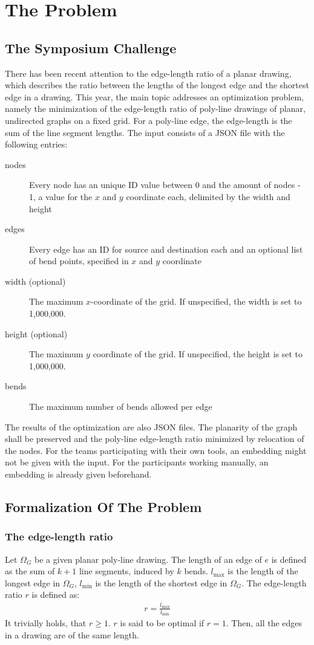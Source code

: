 \section{The Problem}

\subsection{The Symposium Challenge}
There has been recent attention to the edge-length ratio of a planar drawing, which describes the ratio between the lengths of the longest edge and the shortest edge in a drawing. 
\newline This year, the main topic addresses an optimization problem, namely the minimization of the edge-length ratio of poly-line drawings of planar, undirected graphs on a fixed grid. For a poly-line edge, the edge-length is the sum of the line segment lengths.
\bigbreak The input consists of a JSON file with the following entries:
\begin{description}
	\item[nodes] Every node has an unique ID value between 0 and the amount of nodes - 1, a value for the $x$ and $y$ coordinate each, delimited by the width and height
	\item[edges] Every edge has an ID for source and destination each and an optional list of bend points, specified in $x$ and $y$ coordinate
	\item[width (optional)] The maximum $x$-coordinate of the grid. If unspecified, the width is set to 1,000,000.
	\item[height (optional)] The maximum $y$ coordinate of the grid. If unspecified, the height is set to 1,000,000.
	\item[bends] The maximum number of bends allowed per edge
\end{description}
The results of the optimization are also JSON files. The planarity of the graph shall be preserved and the poly-line edge-length ratio minimized by relocation of the nodes.
\bigbreak For the teams participating with their own tools, an embedding might not be given with the input. For the participants working manually, an embedding is already given beforehand.
\cite{GDContest}
\subsection{Formalization Of The Problem}
\subsubsection{The edge-length ratio}
Let $\Omega_G$ be a given planar poly-line drawing. The length of an edge of $e$ is defined as the sum of $k+1$ line segments, induced by $k$ bends. $l_{\max}$ is the length of the longest edge in $\Omega_G$, $l_{\min}$ is the length of the shortest edge in $\Omega_G$. The edge-length ratio $r$ is defined as:
\begin{align}
	r = \frac{l_{\max}}{l_{\min}} 
\end{align}
It trivially holds, that $r\geq1$. $r$ is said to be optimal if $r=1$. Then, all the edges in a drawing are of the same length.

